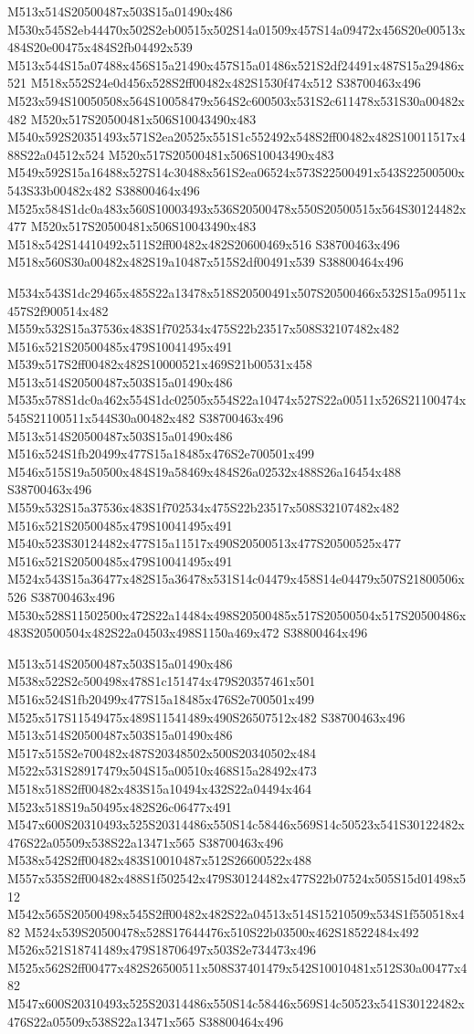 \documentclass{article}
\begin{document}
\begin{multicols}{2}
M513x514S20500487x503S15a01490x486 M530x545S2eb44470x502S2eb00515x502S14a01509x457S14a09472x456S20e00513x484S20e00475x484S2fb04492x539 M513x544S15a07488x456S15a21490x457S15a01486x521S2df24491x487S15a29486x521 M518x552S24e0d456x528S2ff00482x482S1530f474x512 S38700463x496 M523x594S10050508x564S10058479x564S2c600503x531S2c611478x531S30a00482x482 M520x517S20500481x506S10043490x483 M540x592S20351493x571S2ea20525x551S1c552492x548S2ff00482x482S10011517x488S22a04512x524 M520x517S20500481x506S10043490x483 M549x592S15a16488x527S14c30488x561S2ea06524x573S22500491x543S22500500x543S33b00482x482 S38800464x496 M525x584S1dc0a483x560S10003493x536S20500478x550S20500515x564S30124482x477 M520x517S20500481x506S10043490x483 M518x542S14410492x511S2ff00482x482S20600469x516 S38700463x496 M518x560S30a00482x482S19a10487x515S2df00491x539 S38800464x496

M534x543S1dc29465x485S22a13478x518S20500491x507S20500466x532S15a09511x457S2f900514x482 M559x532S15a37536x483S1f702534x475S22b23517x508S32107482x482 M516x521S20500485x479S10041495x491 M539x517S2ff00482x482S10000521x469S21b00531x458 M513x514S20500487x503S15a01490x486 M535x578S1dc0a462x554S1dc02505x554S22a10474x527S22a00511x526S21100474x545S21100511x544S30a00482x482 S38700463x496 M513x514S20500487x503S15a01490x486 M516x524S1fb20499x477S15a18485x476S2e700501x499 M546x515S19a50500x484S19a58469x484S26a02532x488S26a16454x488 S38700463x496 M559x532S15a37536x483S1f702534x475S22b23517x508S32107482x482 M516x521S20500485x479S10041495x491 M540x523S30124482x477S15a11517x490S20500513x477S20500525x477 M516x521S20500485x479S10041495x491 M524x543S15a36477x482S15a36478x531S14c04479x458S14e04479x507S21800506x526 S38700463x496 M530x528S11502500x472S22a14484x498S20500485x517S20500504x517S20500486x483S20500504x482S22a04503x498S1150a469x472 S38800464x496

M513x514S20500487x503S15a01490x486 M538x522S2c500498x478S1c151474x479S20357461x501 M516x524S1fb20499x477S15a18485x476S2e700501x499 M525x517S11549475x489S11541489x490S26507512x482 S38700463x496 M513x514S20500487x503S15a01490x486 M517x515S2e700482x487S20348502x500S20340502x484 M522x531S28917479x504S15a00510x468S15a28492x473 M518x518S2ff00482x483S15a10494x432S22a04494x464 M523x518S19a50495x482S26c06477x491 M547x600S20310493x525S20314486x550S14c58446x569S14c50523x541S30122482x476S22a05509x538S22a13471x565 S38700463x496 M538x542S2ff00482x483S10010487x512S26600522x488 M557x535S2ff00482x488S1f502542x479S30124482x477S22b07524x505S15d01498x512 M542x565S20500498x545S2ff00482x482S22a04513x514S15210509x534S1f550518x482 M524x539S20500478x528S17644476x510S22b03500x462S18522484x492 M526x521S18741489x479S18706497x503S2e734473x496 M525x562S2ff00477x482S26500511x508S37401479x542S10010481x512S30a00477x482 M547x600S20310493x525S20314486x550S14c58446x569S14c50523x541S30122482x476S22a05509x538S22a13471x565 S38800464x496


\end{multicols}
\end{document}
